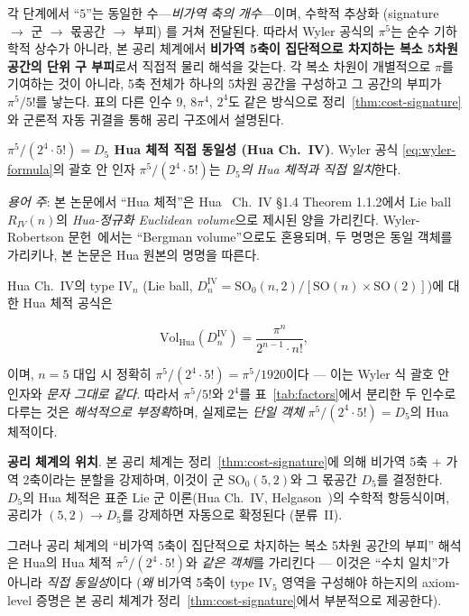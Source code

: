 \documentclass[entropy,article,submit,pdftex,oneauthor]{Definitions/mdpi}
\begin{document}
각 단계에서 ``$5$''는 동일한 수---\emph{비가역 축의 개수}---이며, 수학적 추상화 (signature $\to$ 군 $\to$ 몫공간 $\to$ 부피) 를 거쳐 전달된다. 따라서 Wyler 공식의 $\pi^5$는 순수 기하학적 상수가 아니라, 본 공리 체계에서 \textbf{비가역 5축이 집단적으로 차지하는 복소 5차원 공간의 단위 구 부피}로서 직접적 물리 해석을 갖는다. 각 복소 차원이 개별적으로 $\pi$를 기여하는 것이 아니라, 5축 전체가 하나의 5차원 공간을 구성하고 그 공간의 부피가 $\pi^5 / 5!$를 낳는다. 표의 다른 인수 $9$, $8\pi^4$, $2^4$도 같은 방식으로 정리~\ref{thm:cost-signature}와 군론적 자동 귀결을 통해 공리 구조에서 설명된다.

\textbf{$\pi^5/(2^4 \cdot 5!) = D_5$ Hua 체적 직접 동일성 (Hua Ch.~IV)}. Wyler 공식 \eqref{eq:wyler-formula}의 괄호 안 인자 $\pi^5/(2^4 \cdot 5!)$는 \emph{$D_5$의 Hua 체적과 직접 일치}한다.

\textit{용어 주}: 본 논문에서 ``Hua 체적''은 Hua~\cite{hua1963} Ch.~IV \S1.4 Theorem 1.1.2에서 Lie ball $R_{IV}(n)$의 \emph{Hua-정규화 Euclidean volume}으로 제시된 양을 가리킨다. Wyler-Robertson 문헌~\cite{wyler1969,robertson1971}에서는 ``Bergman volume''으로도 혼용되며, 두 명명은 동일 객체를 가리키나, 본 논문은 Hua 원본의 명명을 따른다.

Hua Ch.~IV의 type IV$_n$ (Lie ball, $D_n^{\text{IV}} = \mathrm{SO}_0(n,2)/[\mathrm{SO}(n)\times\mathrm{SO}(2)]$)에 대한 Hua 체적 공식은
\begin{linenomath}
\begin{equation}
\mathrm{Vol}_{\text{Hua}}(D_n^{\text{IV}}) = \frac{\pi^n}{2^{n-1} \cdot n!},
\label{eq:hua-volume}
\end{equation}
\end{linenomath}
이며, $n=5$ 대입 시 정확히 $\pi^5/(2^4 \cdot 5!) = \pi^5/1920$이다 — 이는 Wyler 식 괄호 안 인자와 \emph{문자 그대로 같다}. 따라서 $\pi^5/5!$와 $2^4$를 표~\ref{tab:factors}에서 분리한 두 인수로 다루는 것은 \emph{해석적으로 부정확}하며, 실제로는 \emph{단일 객체} $\pi^5/(2^4 \cdot 5!) = D_5$의 Hua 체적이다.

\textbf{공리 체계의 위치}. 본 공리 체계는 정리~\ref{thm:cost-signature}에 의해 비가역 5축 + 가역 2축이라는 분할을 강제하며, 이것이 군 $\mathrm{SO}_0(5,2)$와 그 몫공간 $D_5$를 결정한다. $D_5$의 Hua 체적은 표준 Lie 군 이론(Hua Ch.~IV, Helgason~\cite{helgason1978})의 수학적 항등식이며, 공리가 $(5,2) \to D_5$를 강제하면 자동으로 확정된다 (분류~II).

그러나 공리 체계의 ``비가역 5축이 집단적으로 차지하는 복소 5차원 공간의 부피'' 해석은 Hua의 Hua 체적 $\pi^5/(2^4 \cdot 5!)$와 \emph{같은 객체}를 가리킨다 — 이것은 ``수치 일치''가 아니라 \emph{직접 동일성}이다 (\emph{왜} 비가역 5축이 type IV$_5$ 영역을 구성해야 하는지의 axiom-level 증명은 본 공리 체계가 정리~\ref{thm:cost-signature}에서 부분적으로 제공한다).
\end{document}

